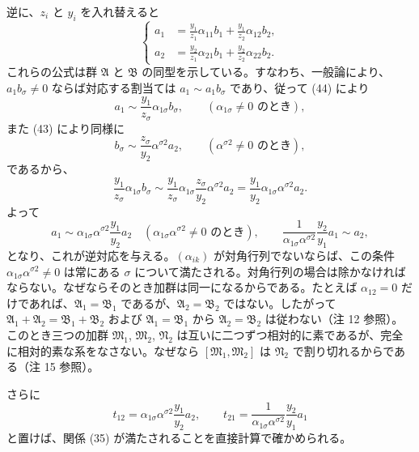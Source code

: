 逆に、$z_i$ と $y_i$ を入れ替えると
\begin{equation}
\left\{
\begin{aligned}
 a_1&=\frac{y_1}{z_1}\alpha_{11}b_1+\frac{y_1}{z_2}\alpha_{12}b_2,\\
 a_2&=\frac{y_2}{z_1}\alpha_{21}b_1+\frac{y_2}{z_2}\alpha_{22}b_2.
\end{aligned}\right.
\tag{44}
\end{equation}
これらの公式は群 $\mathfrak A$ と $\mathfrak B$ の同型を示している。すなわち、一般論により、$a_1b_\sigma\ne0$ ならば対応する割当ては $a_1\sim a_1b_\sigma$ であり、従って (44) により
\[
 a_1\sim\frac{y_1}{z_\sigma}\alpha_{1\sigma}b_\sigma,
 \qquad(\alpha_{1\sigma}\ne0\text{ のとき}),
\]
また (43) により同様に
\[
 b_\sigma\sim\frac{z_\sigma}{y_2}\alpha^{\sigma2}a_2,
 \qquad(\alpha^{\sigma2}\ne0\text{ のとき}),
\]
であるから、
\[
 \frac{y_1}{z_\sigma}\alpha_{1\sigma}b_\sigma
 \sim
 \frac{y_1}{z_\sigma}\alpha_{1\sigma}\frac{z_\sigma}{y_2}\alpha^{\sigma2}a_2
 =\frac{y_1}{y_2}\alpha_{1\sigma}\alpha^{\sigma2}a_2.
\]
よって
\[
 a_1\sim\alpha_{1\sigma}\alpha^{\sigma2}\frac{y_1}{y_2}a_2
 \quad(\alpha_{1\sigma}\alpha^{\sigma2}\ne0\text{ のとき}),
 \qquad
 \frac{1}{\alpha_{1\sigma}\alpha^{\sigma2}}\frac{y_2}{y_1}a_1\sim a_2,
\]
となり、これが逆対応を与える。$(\alpha_{ik})$ が対角行列でないならば、この条件 $\alpha_{1\sigma}\alpha^{\sigma2}\ne0$ は常にある $\sigma$ について満たされる。対角行列の場合は除かなければならない。なぜならそのとき加群は同一になるからである。たとえば $\alpha_{12}=0$ だけであれば、$\mathfrak A_1=\mathfrak B_1$ であるが、$\mathfrak A_2=\mathfrak B_2$ ではない。したがって $\mathfrak A_1+\mathfrak A_2=\mathfrak B_1+\mathfrak B_2$ および $\mathfrak A_1=\mathfrak B_1$ から $\mathfrak A_2=\mathfrak B_2$ は従わない（注 12 参照）。このとき三つの加群 $\mathfrak M_1$, $\mathfrak M_2$, $\mathfrak N_2$ は互いに二つずつ相対的に素であるが、完全に相対的素な系をなさない。なぜなら $[\mathfrak M_1,\mathfrak M_2]$ は $\mathfrak N_2$ で割り切れるからである（注 15 参照）。

さらに
\[
 t_{12}=\alpha_{1\sigma}\alpha^{\sigma2}\frac{y_1}{y_2}a_2,
 \qquad
 t_{21}=\frac{1}{\alpha_{1\sigma}\alpha^{\sigma2}}\frac{y_2}{y_1}a_1
\]
と置けば、関係 (35) が満たされることを直接計算で確かめられる。

